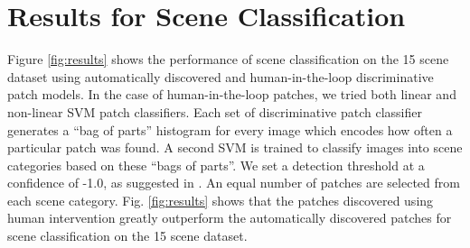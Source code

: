 \documentclass[10pt,twocolumn,letterpaper]{article}
\begin{document}



\section{Results for Scene Classification}
Figure \ref{fig:results} shows the performance of scene classification on the 15 scene dataset using automatically discovered and human-in-the-loop discriminative patch models. In the case of human-in-the-loop patches, we tried both linear and non-linear SVM patch classifiers. Each set of discriminative patch classifier generates a ``bag of parts'' histogram for every image which encodes how often a particular patch was found. A second SVM is trained to classify images into scene categories based on these ``bags of parts''.  We set a detection threshold at a confidence of -1.0, as suggested in \cite{singh2012unsupervised}. An equal number of patches are selected from each scene category. Fig. \ref{fig:results} shows that the patches discovered using human intervention greatly outperform the automatically discovered patches for scene classification on the 15 scene dataset.
\end{document}
